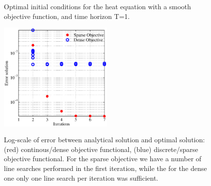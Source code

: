 \documentclass[10pt]{article}
\begin{document}
\begin{figure}[!ht]
\centering
{}
\quad
{}
\caption{Optimal initial conditions for the heat equation with a smooth objective function, and time horizon T=1.}
\end{figure}



\begin{figure}[!ht]
\centering
\includegraphics[width=0.5\textwidth]{decayregvsc.eps}
\label{fig:opt_heatass}
\caption{Log-scale of error between analytical solution and optimal solution: (red) continous/dense objective functional, (blue) discrete/sparse objective functional. For the sparse objective we have a number of line searches performed in the first iteration, while the for the dense one only one line search per iteration was sufficient.}
\end{figure}
\end{document}
